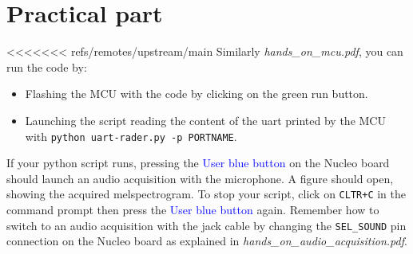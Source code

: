 \section{Practical part}
%
<<<<<<< refs/remotes/upstream/main
Similarly \emph{hands\_on\_mcu.pdf}, you can run the code by:
\begin{itemize}
	\item Flashing the MCU with the code by clicking on the green run button.
	\item Launching the script reading the content of the uart printed by the MCU with \texttt{python uart-rader.py -p PORTNAME}. 
\end{itemize}
If your python script runs, pressing the \textcolor{blue}{User blue button} on the Nucleo board should launch an audio acquisition with the microphone. A figure should open, showing the acquired melspectrogram. To stop your script, click on \texttt{CLTR+C} in the command prompt then press the \textcolor{blue}{User blue button} again.  Remember how to switch to an audio acquisition with the jack cable by changing the \texttt{SEL\_SOUND} pin connection on the Nucleo board as explained in \emph{hands\_on\_audio\_acquisition.pdf}. 
%
